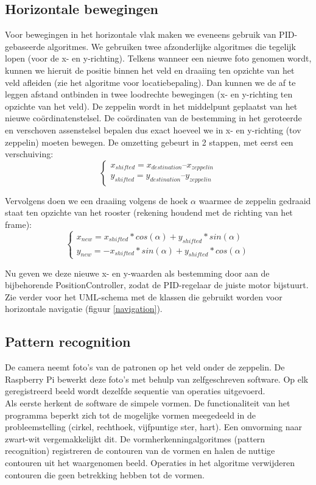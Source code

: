 \documentclass[eind]{penoverslag}
\begin{document}
\subsection{Horizontale bewegingen}
Voor bewegingen in het horizontale vlak maken we eveneens gebruik van PID-gebaseerde algoritmes. We gebruiken twee afzonderlijke algoritmes die tegelijk lopen (voor de x- en y-richting). Telkens wanneer een nieuwe foto genomen wordt, kunnen we hieruit de positie binnen het veld en draaiing ten opzichte van het veld afleiden (zie het algoritme voor locatiebepaling). Dan kunnen we de af te leggen afstand ontbinden in twee loodrechte bewegingen (x- en y-richting ten opzichte van het veld). De zeppelin wordt in het middelpunt geplaatst van het nieuwe co\"{o}rdinatenstelsel. De co\"{o}rdinaten van de bestemming in het geroteerde en verschoven assenstelsel bepalen dus exact hoeveel we in x- en y-richting (tov zeppelin) moeten bewegen. De omzetting gebeurt in 2 stappen, met eerst een verschuiving:
\begin{equation}
 \begin{cases}
  x_{shifted} = x_{destination} – x_{zeppelin}\\
  y_{shifted} = y_{destination} – y_{zeppelin}
 \end{cases}
\end{equation}



Vervolgens doen we een draaiing volgens de hoek $\alpha$ waarmee de zeppelin gedraaid staat ten opzichte van het rooster (rekening houdend met de richting van het frame):
\begin{equation}
 \begin{cases}
 x_{new} = x_{shifted}*cos(\alpha) + y_{shifted}*sin(\alpha)\\
y_{new} = -x_{shifted}*sin(\alpha) + y_{shifted}*cos(\alpha)
 \end{cases}
\end{equation}

Nu geven we deze nieuwe x- en y-waarden als bestemming door aan de bijbehorende PositionController, zodat de PID-regelaar de juiste motor bijstuurt. Zie verder voor het UML-schema met de klassen die gebruikt worden voor horizontale navigatie (figuur \ref{navigation}).

\subsection{Pattern recognition}
De camera neemt foto’s van de patronen op het veld onder de zeppelin. De Raspberry Pi bewerkt deze foto’s met behulp van zelfgeschreven software. Op elk geregistreerd beeld wordt dezelfde sequentie van operaties uitgevoerd. \\
Als eerste herkent de software de simpele vormen. De functionaliteit van het programma beperkt zich tot de mogelijke vormen meegedeeld in de probleemstelling (cirkel, rechthoek, vijfpuntige ster, hart). Een omvorming naar zwart-wit vergemakkelijkt dit. De vormherkenningalgoritmes (pattern recognition) registreren de contouren van de vormen en halen de nuttige contouren uit het waargenomen beeld. Operaties in het algoritme verwijderen contouren die geen betrekking hebben tot de vormen. \\
\end{document}
